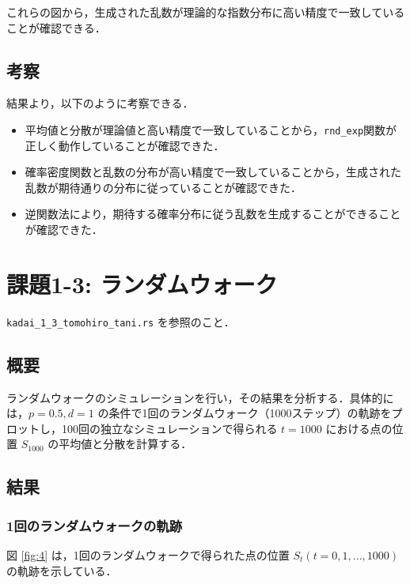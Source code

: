 \documentclass[fleqn, a4paper. 12pt]{jsarticle}
\begin{document}
    これらの図から，生成された乱数が理論的な指数分布に高い精度で一致していることが確認できる．

    \subsection*{考察}

      結果より，以下のように考察できる．

    \begin{itemize}
        \item 平均値と分散が理論値と高い精度で一致していることから，\texttt{rnd\_exp}関数が正しく動作していることが確認できた．
        \item 確率密度関数と乱数の分布が高い精度で一致していることから，生成された乱数が期待通りの分布に従っていることが確認できた．
        \item 逆関数法により，期待する確率分布に従う乱数を生成することができることが確認できた．
    \end{itemize}

  \newpage

  \section*{課題1-3: ランダムウォーク}

    \texttt{kadai\_1\_3\_tomohiro\_tani.rs} を参照のこと．

    \subsection*{概要}
    ランダムウォークのシミュレーションを行い，その結果を分析する．具体的には，$p = 0.5, d = 1$ の条件で1回のランダムウォーク（1000ステップ）の軌跡をプロットし，100回の独立なシミュレーションで得られる $t = 1000$ における点の位置 $S_{1000}$ の平均値と分散を計算する．
    
    \subsection*{結果}
    
    \subsubsection*{1回のランダムウォークの軌跡}
    図 \ref{fig:4} は，1回のランダムウォークで得られた点の位置 $S_t (t = 0, 1, ..., 1000)$ の軌跡を示している．
    
\end{document}
